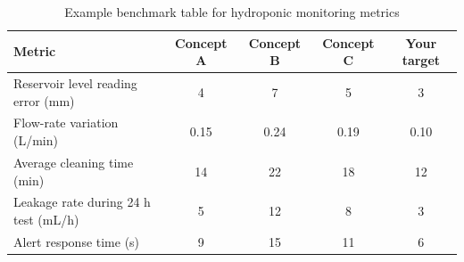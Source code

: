 \begin{table}[htbp]
\centering
\scriptsize
\caption{Example benchmark table for hydroponic monitoring metrics}
\label{table:metric comparison}
\renewcommand{\arraystretch}{1.2}
\begin{tabularx}{\textwidth}{|>{\raggedright\arraybackslash}p{}|c|c|c|c|}
\hline
\textbf{Metric} & \textbf{Concept A} & \textbf{Concept B} & \textbf{Concept C} & \textbf{Your target} \\
\hline
Reservoir level reading error (mm) & 4 & 7 & 5 & 3 \\
\hline
Flow-rate variation (L/min) & 0.15 & 0.24 & 0.19 & 0.10 \\
\hline
Average cleaning time (min) & 14 & 22 & 18 & 12 \\
\hline
Leakage rate during 24 h test (mL/h) & 5 & 12 & 8 & 3 \\
\hline
Alert response time (s) & 9 & 15 & 11 & 6 \\
\hline
\end{tabularx}
\end{table}
